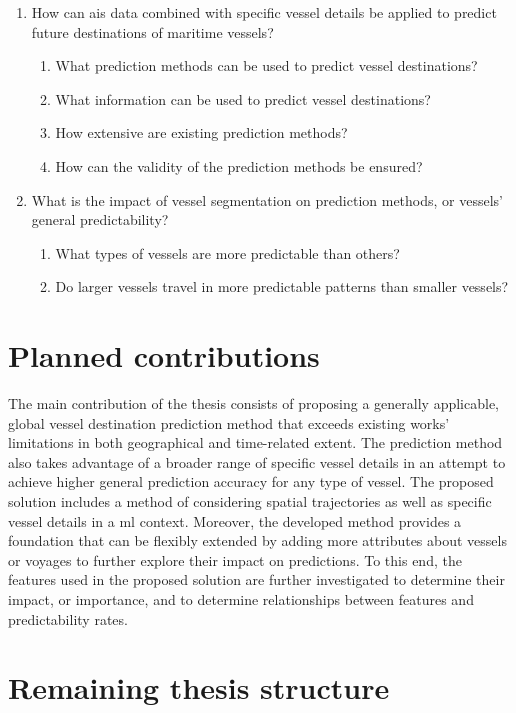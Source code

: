 \begin{enumerate}
    \item How can \acrshort{ais} data combined with specific vessel details be applied to predict future destinations of maritime vessels?
    \begin{enumerate}
    \item What prediction methods can be used to predict vessel destinations?
    \item What information can be used to predict vessel destinations?
    \item How extensive are existing prediction methods?
    \item How can the validity of the prediction methods be ensured?
    \end{enumerate}
    \item What is the impact of vessel segmentation on prediction methods, or vessels' general predictability?
    \begin{enumerate}
    \item What types of vessels are more predictable than others?
    \item Do larger vessels travel in more predictable patterns than smaller vessels?
    \end{enumerate}
\end{enumerate}

\section{Planned contributions}

The main contribution of the thesis consists of proposing a generally applicable, global vessel destination prediction method that exceeds existing works' limitations in both geographical and time-related extent. The prediction method also takes advantage of a broader range of specific vessel details in an attempt to achieve higher general prediction accuracy for any type of vessel. The proposed solution includes a method of considering spatial trajectories as well as specific vessel details in a \acrfull{ml} context. Moreover, the developed method provides a foundation that can be flexibly extended by adding more attributes about vessels or voyages to further explore their impact on predictions. To this end, the features used in the proposed solution are further investigated to determine their impact, or importance, and to determine relationships between features and predictability rates.

\section{Remaining thesis structure}

